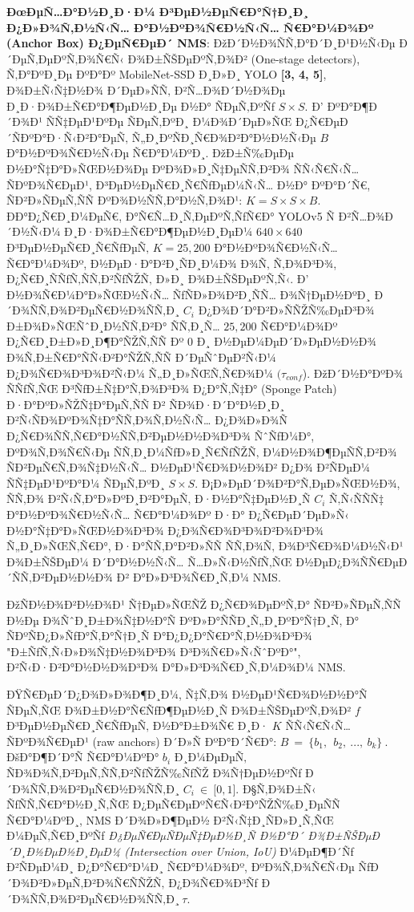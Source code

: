 \documentclass[]{article}
\begin{document}
\textbf{ÐœÐµÑ…Ð°Ð½Ð¸Ð·Ð¼ Ð³ÐµÐ½ÐµÑ€Ð°Ñ†Ð¸Ð¸ Ð¿Ð»Ð¾Ñ‚Ð½Ñ‹Ñ… Ð°Ð½ÐºÐ¾Ñ€Ð½Ñ‹Ñ… Ñ€Ð°Ð¼Ð¾Ðº (Anchor Box) Ð¿ÐµÑ€ÐµÐ´ NMS}: ÐžÐ´Ð½Ð¾ÑÑ‚Ð°Ð´Ð¸Ð¹Ð½Ñ‹Ðµ Ð´ÐµÑ‚ÐµÐºÑ‚Ð¾Ñ€Ñ‹ Ð¾Ð±ÑŠÐµÐºÑ‚Ð¾Ð² (One-stage detectors), Ñ‚Ð°ÐºÐ¸Ðµ ÐºÐ°Ðº MobileNet-SSD Ð¸Ð»Ð¸ YOLO \textbf{{[}3, 4, 5{]}}, Ð¾Ð±Ñ‹Ñ‡Ð½Ð¾ Ð´ÐµÐ»ÑÑ‚ Ð²Ñ…Ð¾Ð´Ð½Ð¾Ðµ Ð¸Ð·Ð¾Ð±Ñ€Ð°Ð¶ÐµÐ½Ð¸Ðµ Ð½Ð° ÑÐµÑ‚ÐºÑƒ \(S \times S\). Ð’ ÐºÐ°Ð¶Ð´Ð¾Ð¹ ÑÑ‡ÐµÐ¹ÐºÐµ ÑÐµÑ‚ÐºÐ¸ Ð¼Ð¾Ð´ÐµÐ»ÑŒ Ð¿Ñ€ÐµÐ´ÑÐºÐ°Ð·Ñ‹Ð²Ð°ÐµÑ‚ Ñ„Ð¸ÐºÑÐ¸Ñ€Ð¾Ð²Ð°Ð½Ð½Ñ‹Ðµ \(B\ \) Ð°Ð½ÐºÐ¾Ñ€Ð½Ñ‹Ðµ Ñ€Ð°Ð¼ÐºÐ¸. ÐžÐ±Ñ‰ÐµÐµ Ð½Ð°Ñ‡Ð°Ð»ÑŒÐ½Ð¾Ðµ ÐºÐ¾Ð»Ð¸Ñ‡ÐµÑÑ‚Ð²Ð¾ ÑÑ‹Ñ€Ñ‹Ñ… ÑÐºÐ¾Ñ€ÐµÐ¹, Ð³ÐµÐ½ÐµÑ€Ð¸Ñ€ÑƒÐµÐ¼Ñ‹Ñ… Ð½Ð° ÐºÐ°Ð´Ñ€, ÑÐ²Ð»ÑÐµÑ‚ÑÑ ÐºÐ¾Ð½ÑÑ‚Ð°Ð½Ñ‚Ð¾Ð¹: \(K = S \times S \times B\). ÐÐ°Ð¿Ñ€Ð¸Ð¼ÐµÑ€, Ð°Ñ€Ñ…Ð¸Ñ‚ÐµÐºÑ‚ÑƒÑ€Ð° YOLOv5 Ñ Ð²Ñ…Ð¾Ð´Ð½Ñ‹Ð¼ Ð¸Ð·Ð¾Ð±Ñ€Ð°Ð¶ÐµÐ½Ð¸ÐµÐ¼ \(640 \times 640\ \) Ð³ÐµÐ½ÐµÑ€Ð¸Ñ€ÑƒÐµÑ‚ \(K = 25,200\) Ð°Ð½ÐºÐ¾Ñ€Ð½Ñ‹Ñ… Ñ€Ð°Ð¼Ð¾Ðº, Ð½ÐµÐ·Ð°Ð²Ð¸ÑÐ¸Ð¼Ð¾ Ð¾Ñ‚ Ñ‚Ð¾Ð³Ð¾, Ð¿Ñ€Ð¸ÑÑƒÑ‚ÑÑ‚Ð²ÑƒÑŽÑ‚ Ð»Ð¸ Ð¾Ð±ÑŠÐµÐºÑ‚Ñ‹. Ð’ Ð½Ð¾Ñ€Ð¼Ð°Ð»ÑŒÐ½Ñ‹Ñ… ÑƒÑÐ»Ð¾Ð²Ð¸ÑÑ… Ð¾Ñ†ÐµÐ½ÐºÐ¸ Ð´Ð¾ÑÑ‚Ð¾Ð²ÐµÑ€Ð½Ð¾ÑÑ‚Ð¸ \(C_{i}\) Ð¿Ð¾Ð´Ð°Ð²Ð»ÑÑŽÑ‰ÐµÐ³Ð¾ Ð±Ð¾Ð»ÑŒÑˆÐ¸Ð½ÑÑ‚Ð²Ð° ÑÑ‚Ð¸Ñ… \(25,200\) Ñ€Ð°Ð¼Ð¾Ðº Ð¿Ñ€Ð¸Ð±Ð»Ð¸Ð¶Ð°ÑŽÑ‚ÑÑ Ðº \(0\) Ð¸ Ð½ÐµÐ¼ÐµÐ´Ð»ÐµÐ½Ð½Ð¾ Ð¾Ñ‚Ð±Ñ€Ð°ÑÑ‹Ð²Ð°ÑŽÑ‚ÑÑ Ð´ÐµÑˆÐµÐ²Ñ‹Ð¼ Ð¿Ð¾Ñ€Ð¾Ð³Ð¾Ð²Ñ‹Ð¼ Ñ„Ð¸Ð»ÑŒÑ‚Ñ€Ð¾Ð¼ \((\tau_{conf}\)). ÐžÐ´Ð½Ð°ÐºÐ¾ ÑÑƒÑ‚ÑŒ Ð³ÑƒÐ±Ñ‡Ð°Ñ‚Ð¾Ð³Ð¾ Ð¿Ð°Ñ‚Ñ‡Ð° (Sponge Patch) Ð·Ð°ÐºÐ»ÑŽÑ‡Ð°ÐµÑ‚ÑÑ Ð² ÑÐ¾Ð·Ð´Ð°Ð½Ð¸Ð¸ Ð²Ñ‹ÑÐ¾ÐºÐ¾Ñ‡Ð°ÑÑ‚Ð¾Ñ‚Ð½Ñ‹Ñ… Ð¿Ð¾Ð»Ð¾Ñ Ð¿Ñ€Ð¾ÑÑ‚Ñ€Ð°Ð½ÑÑ‚Ð²ÐµÐ½Ð½Ð¾Ð³Ð¾ ÑˆÑƒÐ¼Ð°, ÐºÐ¾Ñ‚Ð¾Ñ€Ñ‹Ðµ ÑÑ‚Ð¸Ð¼ÑƒÐ»Ð¸Ñ€ÑƒÑŽÑ‚ Ð¼Ð½Ð¾Ð¶ÐµÑÑ‚Ð²Ð¾ ÑÐ²ÐµÑ€Ñ‚Ð¾Ñ‡Ð½Ñ‹Ñ… Ð½ÐµÐ¹Ñ€Ð¾Ð½Ð¾Ð² Ð¿Ð¾ Ð²ÑÐµÐ¼ ÑÑ‡ÐµÐ¹ÐºÐ°Ð¼ ÑÐµÑ‚ÐºÐ¸ \(S \times S\). Ð¡Ð»ÐµÐ´Ð¾Ð²Ð°Ñ‚ÐµÐ»ÑŒÐ½Ð¾, ÑÑ‚Ð¾ Ð²Ñ‹Ñ‚Ð°Ð»ÐºÐ¸Ð²Ð°ÐµÑ‚ Ð·Ð½Ð°Ñ‡ÐµÐ½Ð¸Ñ \(C_{i}\) Ñ‚Ñ‹ÑÑÑ‡ Ð°Ð½ÐºÐ¾Ñ€Ð½Ñ‹Ñ… Ñ€Ð°Ð¼Ð¾Ðº Ð·Ð° Ð¿Ñ€ÐµÐ´ÐµÐ»Ñ‹ Ð½Ð°Ñ‡Ð°Ð»ÑŒÐ½Ð¾Ð³Ð¾ Ð¿Ð¾Ñ€Ð¾Ð³Ð¾Ð²Ð¾Ð³Ð¾ Ñ„Ð¸Ð»ÑŒÑ‚Ñ€Ð°, Ð·Ð°ÑÑ‚Ð°Ð²Ð»ÑÑ ÑÑ‚Ð¾Ñ‚ Ð¾Ð³Ñ€Ð¾Ð¼Ð½Ñ‹Ð¹ Ð¾Ð±ÑŠÐµÐ¼ Ð´Ð°Ð½Ð½Ñ‹Ñ… Ñ…Ð»Ñ‹Ð½ÑƒÑ‚ÑŒ Ð½ÐµÐ¿Ð¾ÑÑ€ÐµÐ´ÑÑ‚Ð²ÐµÐ½Ð½Ð¾ Ð² Ð°Ð»Ð³Ð¾Ñ€Ð¸Ñ‚Ð¼ NMS.

ÐžÑÐ½Ð¾Ð²Ð½Ð¾Ð¹ Ñ†ÐµÐ»ÑŒÑŽ Ð¿Ñ€Ð¾ÐµÐºÑ‚Ð° ÑÐ²Ð»ÑÐµÑ‚ÑÑ Ð½Ðµ Ð¾ÑˆÐ¸Ð±Ð¾Ñ‡Ð½Ð°Ñ ÐºÐ»Ð°ÑÑÐ¸Ñ„Ð¸ÐºÐ°Ñ†Ð¸Ñ, Ð° ÑÐºÑÐ¿Ð»ÑƒÐ°Ñ‚Ð°Ñ†Ð¸Ñ Ð°Ð¿Ð¿Ð°Ñ€Ð°Ñ‚Ð½Ð¾Ð³Ð¾ "Ð±ÑƒÑ‚Ñ‹Ð»Ð¾Ñ‡Ð½Ð¾Ð³Ð¾ Ð³Ð¾Ñ€Ð»Ñ‹ÑˆÐºÐ°", Ð²Ñ‹Ð·Ð²Ð°Ð½Ð½Ð¾Ð³Ð¾ Ð°Ð»Ð³Ð¾Ñ€Ð¸Ñ‚Ð¼Ð¾Ð¼ NMS.

ÐŸÑ€ÐµÐ´Ð¿Ð¾Ð»Ð¾Ð¶Ð¸Ð¼, Ñ‡Ñ‚Ð¾ Ð½ÐµÐ¹Ñ€Ð¾Ð½Ð½Ð°Ñ ÑÐµÑ‚ÑŒ Ð¾Ð±Ð½Ð°Ñ€ÑƒÐ¶ÐµÐ½Ð¸Ñ Ð¾Ð±ÑŠÐµÐºÑ‚Ð¾Ð² \(f\) Ð³ÐµÐ½ÐµÑ€Ð¸Ñ€ÑƒÐµÑ‚ Ð½Ð°Ð±Ð¾Ñ€ Ð¸Ð· \(K\) ÑÑ‹Ñ€Ñ‹Ñ… ÑÐºÐ¾Ñ€ÐµÐ¹ (raw anchors) Ð´Ð»Ñ ÐºÐ°Ð´Ñ€Ð°:
\(B\  = \ \{ b_{1},\ \ b_{2},\ ...,\ b_{k}\}\ .\)\\
ÐšÐ°Ð¶Ð´Ð°Ñ Ñ€Ð°Ð¼ÐºÐ° \(b_{i}\) Ð¸Ð¼ÐµÐµÑ‚ ÑÐ¾Ð¾Ñ‚Ð²ÐµÑ‚ÑÑ‚Ð²ÑƒÑŽÑ‰ÑƒÑŽ Ð¾Ñ†ÐµÐ½ÐºÑƒ Ð´Ð¾ÑÑ‚Ð¾Ð²ÐµÑ€Ð½Ð¾ÑÑ‚Ð¸ \(C_{i}\  \in \ \lbrack 0,1\rbrack\). Ð§Ñ‚Ð¾Ð±Ñ‹ ÑƒÑÑ‚Ñ€Ð°Ð½Ð¸Ñ‚ÑŒ Ð¿ÐµÑ€ÐµÐºÑ€Ñ‹Ð²Ð°ÑŽÑ‰Ð¸ÐµÑÑ Ñ€Ð°Ð¼ÐºÐ¸, NMS Ð´Ð¾Ð»Ð¶ÐµÐ½ Ð²Ñ‹Ñ‡Ð¸ÑÐ»Ð¸Ñ‚ÑŒ Ð¼ÐµÑ‚Ñ€Ð¸ÐºÑƒ \emph{Ð¿ÐµÑ€ÐµÑÐµÑ‡ÐµÐ½Ð¸Ñ Ð½Ð°Ð´ Ð¾Ð±ÑŠÐµÐ´Ð¸Ð½ÐµÐ½Ð¸ÐµÐ¼ (Intersection over Union, IoU)} Ð¼ÐµÐ¶Ð´Ñƒ Ð²ÑÐµÐ¼Ð¸ Ð¿Ð°Ñ€Ð°Ð¼Ð¸ Ñ€Ð°Ð¼Ð¾Ðº, ÐºÐ¾Ñ‚Ð¾Ñ€Ñ‹Ðµ ÑƒÐ´Ð¾Ð²Ð»ÐµÑ‚Ð²Ð¾Ñ€ÑÑŽÑ‚ Ð¿Ð¾Ñ€Ð¾Ð³Ñƒ Ð´Ð¾ÑÑ‚Ð¾Ð²ÐµÑ€Ð½Ð¾ÑÑ‚Ð¸\(\ \tau\).
\end{document}

